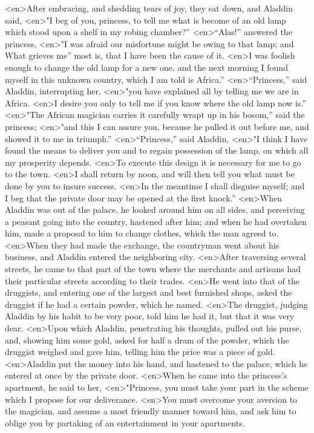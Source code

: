 <en>After embracing, and shedding tears of joy, they sat down, and Aladdin said,
<en>"I beg of you, princess, to tell me what is become of an old lamp which stood upon a shelf in my robing chamber?”
<en>“Alas!” answered the princess,
<en>"I was afraid our misfortune might be owing to that lamp; and What grieves me” most is, that I have been the cause of it.
<en>I was foolish enough to change the old lamp for a new one, and the next morning I found myself in this unknown country, which I am told is Africa.”
<en>“Princess,” said Aladdin, interrupting her,
<en>"you have explained all by telling me we are in Africa.
<en>I desire you only to tell me if you know where the old lamp now is.”
<en>"The African magician carries it carefully wrapt up in his bosom,” said the princess;
<en>"and this I can assure you, because he pulled it out before me, and showed it to me in triumph.”
<en>“Princess,” said Aladdin,
<en>"I think I have found the means to deliver you and to regain possession of the lamp, on which all my prosperity depends.
<en>To execute this design it is necessary for me to go to the town.
<en>I shall return by noon, and will then tell you what must be done by you to insure success.
<en>In the meantime I shall disguise myself; and I beg that the private door may be opened at the first knock.”
<en>When Aladdin was out of the palace, he looked around him on all sides, and perceiving a peasant going into the country, hastened after him; and when he had overtaken him, made a proposal to him to change clothes, which the man agreed to.
<en>When they had made the exchange, the countryman went about his business, and Aladdin entered the neighboring city.
<en>After traversing several streets, he came to that part of the town where the merchants and artisans had their particular streets according to their trades.
<en>He went into that of the druggists, and entering one of the largest and best furnished shops, asked the druggist if he had a certain powder, which he named.
<en>The druggist, judging Aladdin by his habit to be very poor, told him he had it, but that it was very dear.
<en>Upon which Aladdin, penetrating his thoughts, pulled out his purse, and, showing him some gold, asked for half a dram of the powder, which the druggist weighed and gave him, telling him the price was a piece of gold.
<en>Aladdin put the money into his hand, and hastened to the palace, which he entered at once by the private door.
<en>When he came into the princess’s apartment, he said to her,
<en>"Princess, you must take your part in the scheme which I propose for our deliverance.
<en>You must overcome your aversion to the magician, and assume a most friendly manner toward him, and ask him to oblige you by partaking of an entertainment in your apartments.
